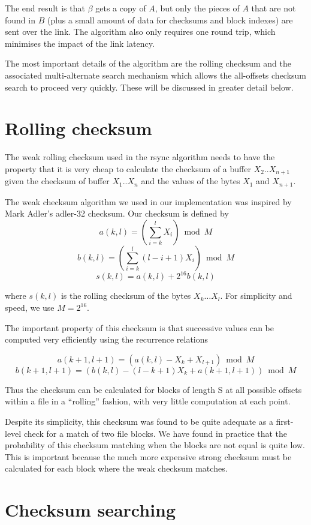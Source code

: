 \documentclass[a4paper]{article}
\begin{document}
The end result is that $\beta$ gets a copy of $A$, but only the pieces
of $A$ that are not found in $B$ (plus a small amount of data for
checksums and block indexes) are sent over the link. The algorithm
also only requires one round trip, which minimises the impact of the
link latency.

The most important details of the algorithm are the rolling checksum
and the associated multi-alternate search mechanism which allows the
all-offsets checksum search to proceed very quickly. These will be
discussed in greater detail below.

\section{Rolling checksum}

The weak rolling checksum used in the rsync algorithm needs to have
the property that it is very cheap to calculate the checksum of a
buffer $X_2 .. X_{n+1}$ given the checksum of buffer $X_1 .. X_n$ and
the values of the bytes $X_1$ and $X_{n+1}$.

The weak checksum algorithm we used in our implementation was inspired
by Mark Adler's adler-32 checksum.  Our checksum is defined by
$$ a(k,l) = (\sum_{i=k}^l X_i) \bmod M $$
$$ b(k,l) = (\sum_{i=k}^l (l-i+1)X_i) \bmod M $$
$$ s(k,l) = a(k,l) + 2^{16} b(k,l) $$

where $s(k,l)$ is the rolling checksum of the bytes $X_k \ldots X_l$.
For simplicity and speed, we use $M = 2^{16}$.

The important property of this checksum is that successive values can
be computed very efficiently using the recurrence relations

$$ a(k+1,l+1) = (a(k,l) - X_k + X_{l+1}) \bmod M $$
$$ b(k+1,l+1) = (b(k,l) - (l-k+1) X_k + a(k+1,l+1)) \bmod M $$

Thus the checksum can be calculated for blocks of length S at all
possible offsets within a file in a ``rolling'' fashion, with very
little computation at each point.

Despite its simplicity, this checksum was found to be quite adequate as
a first-level check for a match of two file blocks.  We have found in
practice that the probability of this checksum matching when the
blocks are not equal is quite low.  This is important because the much
more expensive strong checksum must be calculated for each block where
the weak checksum matches.

\section{Checksum searching}
\end{document}
